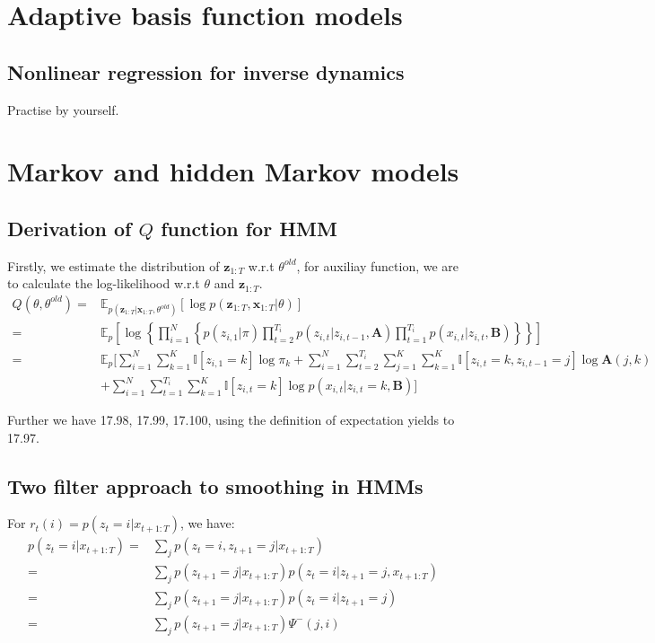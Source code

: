 \documentclass[UTF8]{ctexart}
\begin{document}
\newpage
\section{Adaptive basis function models}
\subsection{Nonlinear regression for inverse dynamics}
Practise by yourself.

\newpage
\section{Markov and hidden Markov models}
\subsection{Derivation of $Q$ function for HMM}
Firstly, we estimate the distribution of $\textbf{z}_{1:T}$ w.r.t $\theta^{old}$, for auxiliay function, we are to calculate the log-likelihood w.r.t $\theta$ and $\textbf{z}_{1:T}$.
\begin{align}
Q(\theta,\theta^{old})=&\mathbb{E}_{p(\textbf{z}_{1:T}|\textbf{x}_{1:T},\theta^{old})}[\log p(\textbf{z}_{1:T},\textbf{x}_{1:T}|\theta)] \nonumber \\
=&\mathbb{E}_{p}[\log \left\{ \prod_{i=1}^{N} \left\{p(z_{i,1}|\pi)\prod_{t=2}^{T_{i}}p(z_{i,t}|z_{i,t-1},\textbf{A})\prod_{t=1}^{T_{i}}p(x_{i,t}|z_{i,t},\textbf{B})\right\}\right\}] \nonumber \\
=&\mathbb{E}_{p}[\sum_{i=1}^{N}\sum_{k=1}^{K}\mathbb{I}[z_{i,1}=k]\log \pi_{k}+\sum_{i=1}^{N}\sum_{t=2}^{T_{i}}\sum_{j=1}^{K}\sum_{k=1}^{K}\mathbb{I}[z_{i,t}=k,z_{i,t-1}=j]\log \textbf{A}(j,k)\nonumber \\
\ &+\sum_{i=1}^{N}\sum_{t=1}^{T_{i}}\sum_{k=1}^{K}\mathbb{I}[z_{i,t}=k]\log p(x_{i,t}|z_{i,t}=k,\textbf{B}) ] \nonumber
\end{align}

Further we have 17.98, 17.99, 17.100, using the definition of expectation yields to 17.97.

\subsection{Two filter approach to smoothing in HMMs}
For $r_{t}(i)=p(z_{t}=i|x_{t+1:T})$, we have:
\begin{align}
p(z_{t}=i|x_{t+1:T})=&\sum_{j}p(z_{t}=i,z_{t+1}=j|x_{t+1:T}) \nonumber \\
=&\sum_{j}p(z_{t+1}=j|x_{t+1:T})p(z_{t}=i|z_{t+1}=j,x_{t+1:T}) \nonumber \\
=&\sum_{j}p(z_{t+1}=j|x_{t+1:T})p(z_{t}=i|z_{t+1}=j) \nonumber \\
=&\sum_{j}p(z_{t+1}=j|x_{t+1:T})\Psi^{-}(j,i) \nonumber
\end{align}
\end{document}
